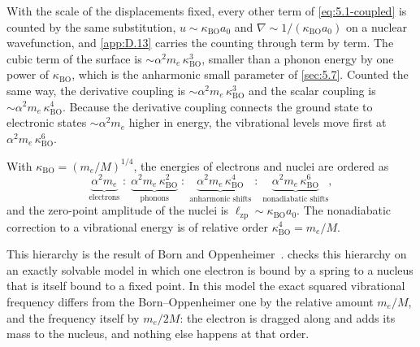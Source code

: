 With the scale of the displacements fixed, every other term of \cref{eq:5.1-coupled} is counted by the same substitution, $u \sim \kappa_{\mathrm{BO}}a_0$ and $\nabla \sim 1/(\kappa_{\mathrm{BO}}a_0)$ on a nuclear wavefunction, and \cref{app:D.13} carries the counting through term by term. The cubic term of the surface is $\sim\alpha^2m_e\,\kappa_{\mathrm{BO}}^3$, smaller than a phonon energy by one power of $\kappa_{\mathrm{BO}}$, which is the anharmonic small parameter of \cref{sec:5.7}. Counted the same way, the derivative coupling is $\sim\alpha^2m_e\,\kappa_{\mathrm{BO}}^3$ and the scalar coupling is $\sim\alpha^2m_e\,\kappa_{\mathrm{BO}}^4$. Because the derivative coupling connects the ground state to electronic states $\sim\alpha^2m_e$ higher in energy, the vibrational levels move first at $\alpha^2m_e\,\kappa_{\mathrm{BO}}^6$.
\begin{keyresult}
With $\kappa_{\mathrm{BO}} = (m_e/M)^{1/4}$, the energies of electrons and nuclei are ordered as
\begin{equation*}
  \underbrace{\alpha^2m_e}_{\text{electrons}}
  \;:\; \underbrace{\alpha^2m_e\,\kappa_{\mathrm{BO}}^2}_{\text{phonons}}
  \;:\; \underbrace{\alpha^2m_e\,\kappa_{\mathrm{BO}}^4}_{\text{anharmonic shifts}}
  \;:\; \underbrace{\alpha^2m_e\,\kappa_{\mathrm{BO}}^6}_{\text{nonadiabatic shifts}} ,
\end{equation*}
and the zero-point amplitude of the nuclei is $\ell_{\mathrm{zp}} \sim \kappa_{\mathrm{BO}}a_0$. The nonadiabatic correction to a vibrational energy is of relative order $\kappa_{\mathrm{BO}}^4 = m_e/M$.
\end{keyresult}
This hierarchy is the result of Born and Oppenheimer~\cite{born1927quantentheorie}.  checks this hierarchy on an exactly solvable model in which one electron is bound by a spring to a nucleus that is itself bound to a fixed point. In this model the exact squared vibrational frequency differs from the Born--Oppenheimer one by the relative amount $m_e/M$, and the frequency itself by $m_e/2M$: the electron is dragged along and adds its mass to the nucleus, and nothing else happens at that order.

